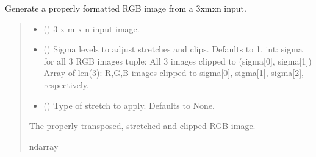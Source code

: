 \documentclass[letterpaper,10pt,english]{sphinxmanual}
\begin{document}

\begin{fulllineitems}
\label{\detokenize{modules:cubespa.utils.normalized_rgb_image}}
\pysigstartsignatures
{}
\pysigstopsignatures
\sphinxAtStartPar
Generate a properly formatted RGB image from a 3xmxn input.
\begin{quote}\begin{description}
\begin{itemize}
\item {} 
\sphinxAtStartPar
{} () \textendash{} 3 x m x n input image.

\item {} 
\sphinxAtStartPar
{} (\sphinxstyleliteralemphasis{\sphinxupquote{, }}) \textendash{} Sigma levels to adjust stretches and clips. Defaults to 1.
int: sigma for all 3 RGB images
tuple: All 3 images clipped to (sigma{[}0{]}, sigma{[}1{]})
Array of len(3): R,G,B images clipped to sigma{[}0{]}, sigma{[}1{]}, sigma{[}2{]}, respectively.

\item {} 
\sphinxAtStartPar
{} (\sphinxstyleliteralemphasis{\sphinxupquote{, }}) \textendash{} Type of stretch to apply. Defaults to None.

\end{itemize}

\sphinxAtStartPar
The properly transposed, stretched and clipped RGB image.

\sphinxAtStartPar
ndarray

\end{description}\end{quote}

\end{fulllineitems}
\end{document}
